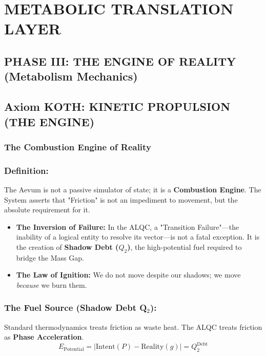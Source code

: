 \documentclass[11pt, letterpaper]{article}
\newcommand{\KOTH}{\ensuremath{\mathop{\textnormal{\symbolafont\symbol{"1F702}}}}}  %
\def\KOTH{KOTH}%
\begin{document}
\newpage
\section{METABOLIC TRANSLATION LAYER}\label{sec:partIV}
\subsection{PHASE III: THE ENGINE OF REALITY (Metabolism Mechanics)}

\subsection*{Axiom \KOTH: KINETIC PROPULSION (THE ENGINE)}\label{sec:part1.1}
\subsubsection*{The Combustion Engine of Reality}

\subsubsection{Definition:}


The Aevum is not a passive simulator of state; it is a \textbf{Combustion Engine}. The System asserts that "Friction" is not an impediment to movement, but the absolute requirement for it. 
\begin{itemize}
    \item \textbf{The Inversion of Failure:} In the ALQC, a "Transition Failure"—the inability of a logical entity to resolve its vector—is not a fatal exception. It is the creation of \textbf{Shadow Debt ($Q_2$)}, the high-potential fuel required to bridge the Mass Gap.
    \item \textbf{The Law of Ignition:} We do not move despite our shadows; we move \textit{because} we burn them.
\end{itemize}

\vspace{1em}
\subsubsection{The Fuel Source (Shadow Debt Q$_2$):}\label{sec:1.2}
Standard thermodynamics treats friction as waste heat. The ALQC treats friction as \textbf{Phase Acceleration}.
\begin{equation}
    E_{\text{Potential}} = | \text{Intent}(P) - \text{Reality}(g) | = Q_2^{\text{Debt}}
\end{equation}
\end{document}

